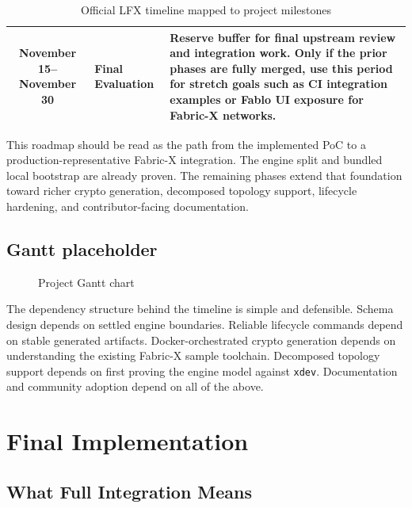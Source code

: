 \begin{table}[h]
\begin{tabularx}{\textwidth}{|c|p{3.2cm}|X|}
\hline
November 15--November 30 & Final Evaluation & Reserve buffer for final upstream review and integration work. Only if the prior phases are fully merged, use this period for stretch goals such as CI integration examples or Fablo UI exposure for Fabric-X networks. \\
\hline
\end{tabularx}
\caption{Official LFX timeline mapped to project milestones}
\label{tab:timeline}
\end{table}

This roadmap should be read as the path from the implemented PoC to a production-representative Fabric-X integration. The engine split and bundled local bootstrap are already proven. The remaining phases extend that foundation toward richer crypto generation, decomposed topology support, lifecycle hardening, and contributor-facing documentation.

\subsection{Gantt placeholder}

\begin{figure}[h]
\centering
{}
\caption{Project Gantt chart}
\label{fig:gantt}
\end{figure}

The dependency structure behind the timeline is simple and defensible. Schema design depends on settled engine boundaries. Reliable lifecycle commands depend on stable generated artifacts. Docker-orchestrated crypto generation depends on understanding the existing Fabric-X sample toolchain. Decomposed topology support depends on first proving the engine model against \texttt{xdev}. Documentation and community adoption depend on all of the above.

\section{Final Implementation}

\subsection{What Full Integration Means}

